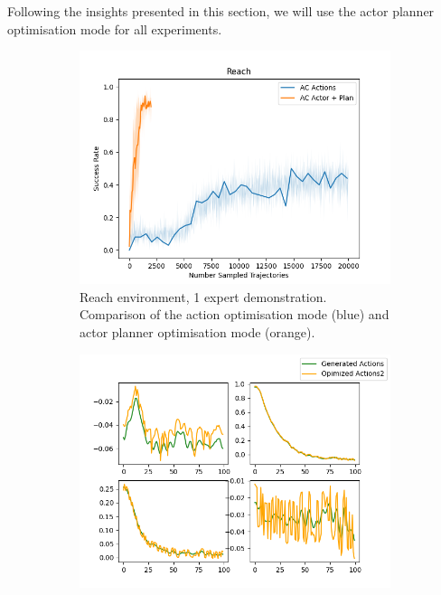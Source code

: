 Following the insights presented in this section, we will use the actor planner optimisation mode for all experiments.

\begin{figure}[htbp]
    \centering
    \begin{subfigure}[t]{0.65\textwidth}
      \includegraphics[width=\textwidth]{images/Plan_vs_Actions/Reach.png}
      \caption{Reach environment, 1 expert demonstration. Comparison of the action optimisation mode (blue) and actor planner optimisation mode (orange).}
      \label{fig:plot1}
    \end{subfigure}
    \medskip
    \begin{subfigure}[t]{0.45\textwidth}
      \includegraphics[width=\textwidth]{images/Plan_vs_Actions/changes/actions_1.png}

\end{subfigure}
\end{figure}

